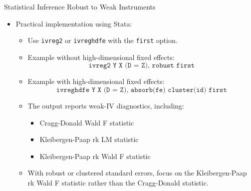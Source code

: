 \documentclass[dvipsnames,hyperref={pdfpagelabels=false}]{beamer}
\begin{document}



\begin{frame}{Statistical Inference Robust to Weak Instruments}
	\begin{itemize}
	
		\item Practical implementation using Stata:
		\begin{itemize}
			\vspace{0.2cm}

			\item Use \texttt{ivreg2} or \texttt{ivreghdfe} with the \texttt{first} option.
			\vspace{0.2cm}

			\item Example without high-dimensional fixed effects:
			\begin{equation*}
			\texttt{ivreg2 Y X (D = Z), robust first}
			\end{equation*}

			\item Example with high-dimensional fixed effects:
			\begin{equation*}
			\texttt{ivreghdfe Y X (D = Z), absorb(fe) cluster(id) first}
			\end{equation*}

			\item The output reports weak-IV diagnostics, including:
			\begin{itemize}
				\item Cragg-Donald Wald F statistic
				\item Kleibergen-Paap rk LM statistic
				\item Kleibergen-Paap rk Wald F statistic
			\end{itemize}

			\vspace{0.2cm}

			\item With robust or clustered standard errors, focus on the Kleibergen-Paap rk Wald F statistic rather than the Cragg-Donald statistic.
		\end{itemize}
	\end{itemize}
\end{frame}
\end{document}
